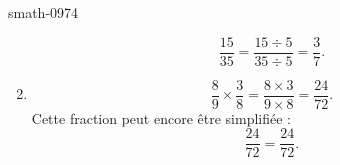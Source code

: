\begin{corrige}{smath-0974}
\begin{enumerate}
            \begin{equation}
                \frac{ 15 }{ 35 }=\frac{ 15\div 5 }{ 35\div 5 }=\frac{ 3 }{ 7 }.
            \end{equation}
        \item
            \begin{equation}
                \frac{ 8 }{ 9 }\times \frac{ 3 }{ 8 }=\frac{ 8\times 3 }{ 9\times 8 }=\frac{ 24 }{ 72 }.
            \end{equation}
            Cette fraction peut encore être simplifiée :
            \begin{equation}
                \frac{ 24 }{ 72 }=\frac{ 24 }{ 72 }.
            \end{equation}
    \end{enumerate}

\end{corrige}
